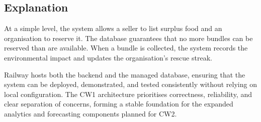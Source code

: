 \documentclass[11pt,a4paper]{article}
\begin{document}
\subsection{Explanation}

At a simple level, the system allows a seller to list surplus food and an organisation to reserve it. The database guarantees that no more bundles can be reserved than are available. When a bundle is collected, the system records the environmental impact and updates the organisation’s rescue streak.

Railway hosts both the backend and the managed database, ensuring that the system can be deployed, demonstrated, and tested consistently without relying on local configuration. The CW1 architecture prioritises correctness, reliability, and clear separation of concerns, forming a stable foundation for the expanded analytics and forecasting components planned for CW2.
\end{document}
